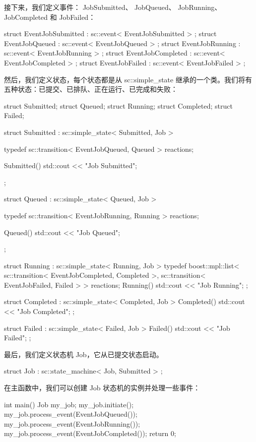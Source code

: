 接下来，我们定义事件： JobSubmitted、 JobQueued、 JobRunning、 JobCompleted 和 JobFailed：

\begin{cpp}
struct EventJobSubmitted : sc::event< EventJobSubmitted > {};
struct EventJobQueued : sc::event< EventJobQueued > {};
struct EventJobRunning : sc::event< EventJobRunning > {};
struct EventJobCompleted : sc::event< EventJobCompleted > {};
struct EventJobFailed : sc::event< EventJobFailed > {};
\end{cpp}

然后，我们定义状态，每个状态都是从 sc::simple\_state 继承的一个类。我们将有五种状态：已提交、已排队、正在运行、已完成和失败：

\begin{cpp}
struct Submitted;
struct Queued;
struct Running;
struct Completed;
struct Failed;

struct Submitted : sc::simple_state< Submitted, Job > {
    typedef sc::transition< EventJobQueued, Queued > reactions;

    Submitted() { std::cout << "Job Submitted\n"; }
};

struct Queued : sc::simple_state< Queued, Job > {
    typedef sc::transition< EventJobRunning, Running > reactions;

    Queued() { std::cout << "Job Queued\n"; }
};

struct Running : sc::simple_state< Running, Job > {
    typedef boost::mpl::list<
        sc::transition< EventJobCompleted, Completed >,
        sc::transition< EventJobFailed, Failed >
    > reactions;
    Running() { std::cout << "Job Running\n"; }
};

struct Completed : sc::simple_state< Completed, Job > {
    Completed() { std::cout << "Job Completed\n"; }
};

struct Failed : sc::simple_state< Failed, Job > {
    Failed() { std::cout << "Job Failed\n"; }
};
\end{cpp}

最后，我们定义状态机 Job，它从已提交状态启动。

\begin{cpp}
struct Job : sc::state_machine< Job, Submitted > {};
\end{cpp}

在主函数中，我们可以创建 Job 状态机的实例并处理一些事件：

\begin{cpp}
int main() {
    Job my_job;
    my_job.initiate();
    my_job.process_event(EventJobQueued());
    my_job.process_event(EventJobRunning());
    my_job.process_event(EventJobCompleted());
    return 0;
}
\end{cpp}

